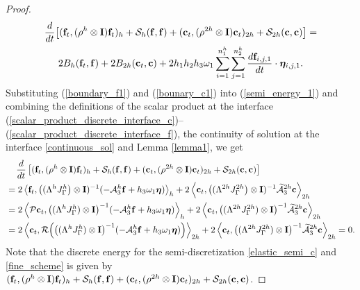 \begin{proof}
	\begin{multline}\label{semi_energy_1}
	\frac{d}{dt}\big[({\bf f}_t,(\rho^h\otimes {\bf I}) {\bf f}_t)_h + \mathcal{S}_{h}({\bf f},{\bf f}) + ({\bf c}_t,(\rho^{2h}\otimes {\bf I}) {\bf c}_t)_{2h} + \mathcal{S}_{2h}({\bf c},{\bf c}) \big]  = \\
	2B_{h}({\bf f}_t,{\bf f}) + 2B_{2h}({\bf c}_t,{\bf c}) + 2h_1h_2h_3\omega_1\sum_{i = 1}^{n_1^h}\sum_{j=1}^{n_2^h}\frac{d{\bf f}_{i,j,1}}{dt}\cdot{\bm \eta}_{i,j,1}.
	\end{multline}
	Substituting (\ref{boundary_f1}) and (\ref{bounary_c1}) into (\ref{semi_energy_1}) and combining the definitions of the scalar product at the interface (\ref{scalar_product_discrete_interface_c})--(\ref{scalar_product_discrete_interface_f}), the continuity of solution at the interface \eqref{continuous_sol} and Lemma \ref{lemma1}, we get
	\begin{align*}\label{semi_energy_2}
	&\hspace{0.4cm}\frac{d}{dt}\left[({\bf f}_t,(\rho^h\otimes {\bf I}) {\bf f}_t)_{h} + \mathcal{S}_{h}({\bf f},{\bf f}) + ({\bf c}_t,(\rho^{2h}\otimes {\bf I}) {\bf c}_t)_{2h} + \mathcal{S}_{2h}({\bf c},{\bf c}) \right]   \nonumber\\
	& = 2\left<{\bf f}_t,\big(({\Lambda}^{h}{J}^h_\Gamma\big)\otimes {\bf I})^{-1}(-\mathcal{A}_3^h{\bf f}+h_3\omega_1{\bm \eta})\right>_{h}+ 2\left<{\bf c}_t,\big(({\Lambda}^{2h}{J}^{2h}_\Gamma\big)\otimes{\bf I})^{-1}\wt{\mathcal{A}}_3^{2h}{\bf c}\right>_{2h} \nonumber\\
	& = 2\left<{\mathcal{P}}{\bf c}_t,\big(({\Lambda}^{h}{J}^h_\Gamma)\otimes{\bf I}\big)^{-1}(-\mathcal{A}_3^h{\bf f}+h_3\omega_1{\bm \eta})\right>_{h}+ 2\left<{\bf c}_t, \big(({\Lambda}^{2h}{J}^{2h}_\Gamma)\otimes{\bf I}\big)^{-1}\wt{\mathcal{A}}_3^{2h}{\bf c}\right>_{2h} \nonumber\\
	& = 2\left<{\bf c}_t,{\mathcal{R}}\Big(\big(({\Lambda}^{h}{J}^h_\Gamma)\otimes{\bf I}\big)^{-1}(-\mathcal{A}_3^h{\bf f}+h_3\omega_1{\bm \eta})\Big)\right>_{2h}+ 2\left<{\bf c}_t,\big(({\Lambda}^{2h}{J}^{2h}_\Gamma)\otimes{\bf I}\big)^{-1}\wt{\mathcal{A}}_3^{2h}{\bf c}\right>_{2h} = 0.
	\end{align*}
Note that the discrete energy for the semi-discretization \eqref{elastic_semi_c} and \eqref{fine_scheme} is given by $({\bf f}_t,(\rho^h\otimes {\bf I}) {\bf f}_t)_{h} + \mathcal{S}_{h}({\bf f},{\bf f}) + ({\bf c}_t,(\rho^{2h} \otimes {\bf I}){\bf c}_t)_{2h} + \mathcal{S}_{2h}({\bf c},{\bf c})$.
\end{proof}








 